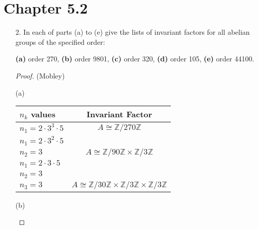 \documentclass[10pt]{article}
\newcommand{\Z}{\mathbb{Z}}
\begin{document}
\section*{Chapter 5.2}

\begin{itemize}

\item[2.]  In each of parts (a) to (e) give the lists of invariant
  factors for all abelian groups of the specified order:

  \textbf{(a)} order 270, \textbf{(b)} order 9801, \textbf{(c)} order
  320, \textbf{(d)} order 105, \textbf{(e)} order 44100.

\begin{proof}(Mobley) \

\begin{item} (a) 

\begin{center}
  \begin{tabular}{ l  c }
    $n_k$ values & Invariant Factor \\ \hline
    $n_1=2\cdot 3^3\cdot 5$ & $A\cong \Z / 270\Z$ \\ \hline
	\hline    
	$n_1=2\cdot 3^2\cdot 5$ &  \\ \hline
	$n_2=3$ & $A\cong \Z / 90\Z \times \Z / 3\Z$ \\ \hline
    \hline
	$n_1=2\cdot 3\cdot 5$ & \\ \hline
	$n_2=3$ & \\ \hline
	$n_3=3$ & $A\cong \Z / 30\Z \times \Z / 3\Z \times \Z / 3\Z$ \\ \hline
	\hline
  \end{tabular}
\end{center} 

\end{item}

\begin{item} (b)


\end{item}
\end{proof}
\end{itemize}
\end{document}
